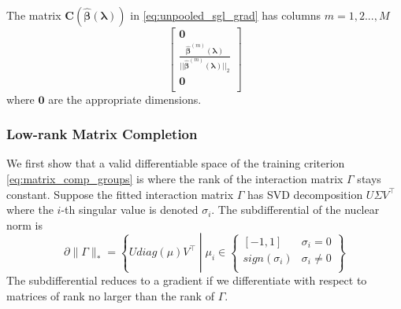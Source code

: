 \documentclass[12pt,letterpaper]{article}
\begin{document}
The matrix $\boldsymbol C(\hat {\boldsymbol \beta}(\boldsymbol \lambda))$ in \eqref{eq:unpooled_sgl_grad} has columns $m=1,2...,M$ 
\begin{equation}
\begin{bmatrix}
\boldsymbol 0\\
\frac{\hat {\boldsymbol \beta}^{(m)}(\boldsymbol \lambda)}{||\hat{\boldsymbol \beta}^{(m)}(\boldsymbol \lambda)||_2}\\
\boldsymbol 0\\
\end{bmatrix}
\end{equation}
where $\boldsymbol 0$ are the appropriate dimensions.

\subsubsection{Low-rank Matrix Completion}
We first show that a valid differentiable space of the training criterion \eqref{eq:matrix_comp_groups} is where the rank of the interaction matrix $\Gamma$ stays constant. Suppose the fitted interaction matrix $\Gamma$ has SVD decomposition $U\Sigma V^\top$ where the $i$-th singular value is denoted $\sigma_i$. The subdifferential of the nuclear norm is
\begin{equation}
\partial \| \Gamma \|_* = 
\left \{
U diag(\mu) V^\top \middle | 
\mu_i \in 
\begin{cases}
[-1, 1] & \sigma_i = 0\\
sign(\sigma_i) & \sigma_i \ne 0\\
\end{cases}
\right \}
\end{equation}
The subdifferential reduces to a gradient if we differentiate with respect to  matrices of rank no larger than the rank of $\Gamma$.
\end{document}
